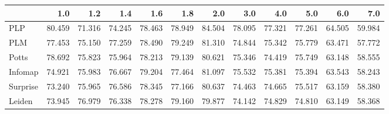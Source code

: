 \begin{tabular}{lrrrrrrrrrrr}
\toprule
{} &    1.0 &    1.2 &    1.4 &    1.6 &    1.8 &    2.0 &    3.0 &    4.0 &    5.0 &    6.0 &    7.0 \\
\midrule
PLP      & 80.459 & 71.316 & 74.245 & 78.463 & 78.949 & 84.504 & 78.095 & 77.321 & 77.261 & 64.505 & 59.984 \\
PLM      & 77.453 & 75.150 & 77.259 & 78.490 & 79.249 & 81.310 & 74.844 & 75.342 & 75.779 & 63.471 & 57.772 \\
Potts    & 78.692 & 75.823 & 75.964 & 78.213 & 79.139 & 80.621 & 75.346 & 74.419 & 75.749 & 63.148 & 58.555 \\
Infomap  & 74.921 & 75.983 & 76.667 & 79.204 & 77.464 & 81.097 & 75.532 & 75.381 & 75.394 & 63.543 & 58.243 \\
Surprise & 73.240 & 75.965 & 76.586 & 78.345 & 77.166 & 80.637 & 74.463 & 74.665 & 75.517 & 63.159 & 58.380 \\
Leiden   & 73.945 & 76.979 & 76.338 & 78.278 & 79.160 & 79.877 & 74.142 & 74.829 & 74.810 & 63.149 & 58.368 \\
\bottomrule
\end{tabular}
